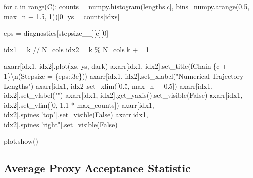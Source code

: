 \documentclass[
  letterpaper,
  DIV=11,
  numbers=noendperiod]{scrartcl}
\newenvironment{Shaded}{\begin{snugshade}}{\end{snugshade}}
\newcommand{\BuiltInTok}[1]{\textcolor[rgb]{0.00,0.23,0.31}{#1}}
\newcommand{\CharTok}[1]{\textcolor[rgb]{0.13,0.47,0.30}{#1}}
\newcommand{\ControlFlowTok}[1]{\textcolor[rgb]{0.00,0.23,0.31}{#1}}
\newcommand{\DecValTok}[1]{\textcolor[rgb]{0.68,0.00,0.00}{#1}}
\newcommand{\FloatTok}[1]{\textcolor[rgb]{0.68,0.00,0.00}{#1}}
\newcommand{\KeywordTok}[1]{\textcolor[rgb]{0.00,0.23,0.31}{#1}}
\newcommand{\NormalTok}[1]{\textcolor[rgb]{0.00,0.23,0.31}{#1}}
\newcommand{\OperatorTok}[1]{\textcolor[rgb]{0.37,0.37,0.37}{#1}}
\newcommand{\SpecialCharTok}[1]{\textcolor[rgb]{0.37,0.37,0.37}{#1}}
\newcommand{\SpecialStringTok}[1]{\textcolor[rgb]{0.13,0.47,0.30}{#1}}
\newcommand{\StringTok}[1]{\textcolor[rgb]{0.13,0.47,0.30}{#1}}
\newcommand{\VariableTok}[1]{\textcolor[rgb]{0.07,0.07,0.07}{#1}}
\begin{document}
\begin{Shaded}
\begin{Highlighting}[]
  \ControlFlowTok{for}\NormalTok{ c }\KeywordTok{in} \BuiltInTok{range}\NormalTok{(C):}
\NormalTok{    counts }\OperatorTok{=}\NormalTok{ numpy.histogram(lengths[c], }
\NormalTok{                             bins}\OperatorTok{=}\NormalTok{numpy.arange(}\FloatTok{0.5}\NormalTok{, max\_n }\OperatorTok{+} \FloatTok{1.5}\NormalTok{, }\DecValTok{1}\NormalTok{))[}\DecValTok{0}\NormalTok{]}
\NormalTok{    ys }\OperatorTok{=}\NormalTok{ counts[idxs]}
    
\NormalTok{    eps }\OperatorTok{=}\NormalTok{ diagnostics[}\StringTok{\textquotesingle{}stepsize\_\_\textquotesingle{}}\NormalTok{][c][}\DecValTok{0}\NormalTok{]}
    
\NormalTok{    idx1 }\OperatorTok{=}\NormalTok{ k }\OperatorTok{//}\NormalTok{ N\_cols}
\NormalTok{    idx2 }\OperatorTok{=}\NormalTok{ k }\OperatorTok{\%}\NormalTok{ N\_cols}
\NormalTok{    k }\OperatorTok{+=} \DecValTok{1}
    
\NormalTok{    axarr[idx1, idx2].plot(xs, ys, dark)}
\NormalTok{    axarr[idx1, idx2].set\_title(}\SpecialStringTok{f\textquotesingle{}Chain }\SpecialCharTok{\{}\NormalTok{c }\OperatorTok{+} \DecValTok{1}\SpecialCharTok{\}}\CharTok{\textbackslash{}n}\SpecialStringTok{(Stepsize = }\SpecialCharTok{\{}\NormalTok{eps}\SpecialCharTok{:.3e\}}\SpecialStringTok{)\textquotesingle{}}\NormalTok{)}
\NormalTok{    axarr[idx1, idx2].set\_xlabel(}\StringTok{"Numerical Trajectory Lengths"}\NormalTok{)}
\NormalTok{    axarr[idx1, idx2].set\_xlim([}\FloatTok{0.5}\NormalTok{, max\_n }\OperatorTok{+} \FloatTok{0.5}\NormalTok{])}
\NormalTok{    axarr[idx1, idx2].set\_ylabel(}\StringTok{""}\NormalTok{)}
\NormalTok{    axarr[idx1, idx2].get\_yaxis().set\_visible(}\VariableTok{False}\NormalTok{)}
\NormalTok{    axarr[idx1, idx2].set\_ylim([}\DecValTok{0}\NormalTok{, }\FloatTok{1.1} \OperatorTok{*}\NormalTok{ max\_counts])}
\NormalTok{    axarr[idx1, idx2].spines[}\StringTok{"top"}\NormalTok{].set\_visible(}\VariableTok{False}\NormalTok{)}
\NormalTok{    axarr[idx1, idx2].spines[}\StringTok{"right"}\NormalTok{].set\_visible(}\VariableTok{False}\NormalTok{)}
  
\NormalTok{  plot.show()}
\end{Highlighting}
\end{Shaded}

\subsection{Average Proxy Acceptance
Statistic}\label{average-proxy-acceptance-statistic}
\end{document}
